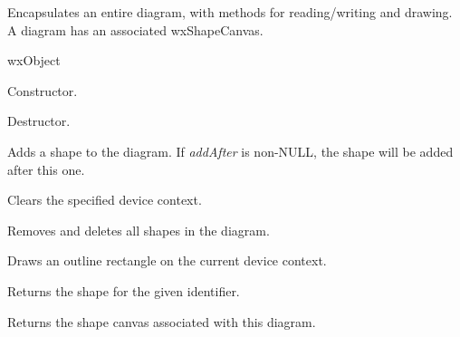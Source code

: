 Encapsulates an entire diagram, with methods for reading/writing and drawing.
A diagram has an associated wxShapeCanvas.


wxObject






Constructor.



Destructor.



Adds a shape to the diagram. If {\it addAfter} is non-NULL, the shape will be added after this
one.



Clears the specified device context.



Removes and deletes all shapes in the diagram.



Draws an outline rectangle on the current device context.

\label{wxdiagramfindshape}


Returns the shape for the given identifier.



Returns the shape canvas associated with this diagram.

